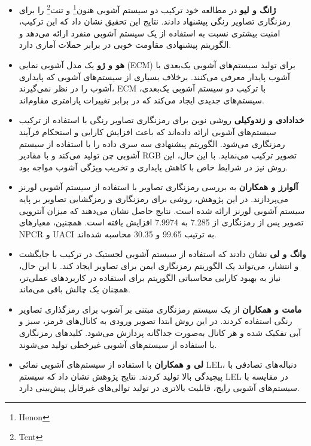 \documentclass[a4paper,12pt]{report}
\renewcommand{\%}{\lr{\oldpercent}}
\providecommand{\lr}[1]{#1}
\providecommand{\LTRfootnote}[1]{\footnote{#1}}
\begin{document}
\begin{itemize}
    \item \textbf{ژانگ و لیو\cite{ref3}} در مطالعه خود ترکیب دو سیستم آشوبی هنون\LTRfootnote{Henon} و تنت\LTRfootnote{Tent} را برای رمزنگاری تصاویر رنگی پیشنهاد دادند. نتایج این تحقیق نشان داد که این ترکیب، امنیت بیشتری نسبت به استفاده از یک سیستم آشوبی منفرد ارائه می‌دهد و الگوریتم پیشنهادی مقاومت خوبی در برابر حملات آماری دارد.
    \item \textbf{هو و ژو\cite{ref4}} یک مدل آشوبی نمایی (\lr{ECM}) برای تولید سیستم‌های آشوبی یک‌بعدی با آشوب پایدار معرفی می‌کنند. برخلاف بسیاری از سیستم‌های آشوبی که پایداری آشوب را در نظر نمی‌گیرند، \lr{ECM} با ترکیب دو سیستم آشوبی یک‌بعدی، سیستم‌های جدیدی ایجاد می‌کند که در برابر تغییرات پارامتری مقاوم‌اند.
    \item \textbf{خدادادی و زندوکیلی\cite{ref7}} روشی نوین برای رمزنگاری تصاویر رنگی با استفاده از ترکیب سیستم‌های آشوبی ارائه داده‌اند که باعث افزایش کارایی و استحکام فرآیند رمزنگاری می‌شود. الگوریتم پیشنهادی سه سری داده را با استفاده از سیستم آشوبی چن تولید می‌کند و با مقادیر \lr{RGB} تصویر ترکیب می‌نماید. با این حال، این روش نیز در شرایط خاص با کاهش پایداری و تخریب ویژگی آشوب مواجه بود.
    \item \textbf{آلوارز و همکاران\cite{ref6}} به بررسی رمزنگاری تصاویر با استفاده از سیستم آشوبی لورنز می‌پردازند. در این پژوهش، روشی برای رمزنگاری و رمزگشایی تصاویر بر پایه سیستم آشوبی لورنز ارائه شده است. نتایج حاصل نشان می‌دهند که میزان آنتروپی تصویر پس از رمزنگاری از 7.285 به 7.9974 افزایش یافته است. همچنین، معیارهای \lr{NPCR} و \lr{UACI} به ترتیب \lr{99.65\%} و \lr{30.35\%} محاسبه شده‌اند.
    \item \textbf{وانگ و لی\cite{ref8}} نشان دادند که استفاده از سیستم آشوبی لجستیک در ترکیب با جایگشت و انتشار، می‌تواند یک الگوریتم رمزنگاری ایمن برای تصاویر ایجاد کند. با این حال، نیاز به بهبود کارایی محاسباتی الگوریتم برای استفاده در کاربردهای عملی‌تر، همچنان یک چالش باقی می‌ماند.
    \item \textbf{مامت و همکاران\cite{ref9}} از یک سیستم رمزنگاری مبتنی بر آشوب برای رمزگذاری تصاویر رنگی استفاده کردند. در این روش ابتدا تصویر ورودی به کانال‌های قرمز، سبز و آبی تفکیک شده و هر کانال به‌صورت جداگانه پردازش می‌شود. کلیدهای رمزنگاری با استفاده از سیستم‌های آشوبی غیرخطی تولید می‌شوند.
    \item \textbf{لی و همکاران\cite{ref10}} با استفاده از سیستم‌های آشوبی نمائی \lr{LEL}، دنباله‌های تصادفی با پیچیدگی بالا تولید کردند. نتایج پژوهش نشان داد که سیستم \lr{LEL} در مقایسه با سیستم‌های آشوبی رایج، قابلیت بالاتری در تولید توالی‌های غیرقابل پیش‌بینی دارد.

\end{itemize}
\end{document}
